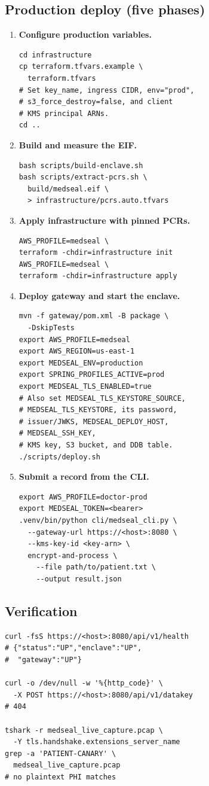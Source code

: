 \documentclass[11pt]{article}
\begin{document}
\subsection{Production deploy (five phases)}
\begin{enumerate}\setlength{\itemsep}{1pt}
    \item \textbf{Configure production variables.}
\begin{verbatim}
cd infrastructure
cp terraform.tfvars.example \
  terraform.tfvars
# Set key_name, ingress CIDR, env="prod",
# s3_force_destroy=false, and client
# KMS principal ARNs.
cd ..
\end{verbatim}
    \item \textbf{Build and measure the EIF.}
\begin{verbatim}
bash scripts/build-enclave.sh
bash scripts/extract-pcrs.sh \
  build/medseal.eif \
  > infrastructure/pcrs.auto.tfvars
\end{verbatim}
    \item \textbf{Apply infrastructure with pinned PCRs.}
\begin{verbatim}
AWS_PROFILE=medseal \
terraform -chdir=infrastructure init
AWS_PROFILE=medseal \
terraform -chdir=infrastructure apply
\end{verbatim}
    \item \textbf{Deploy gateway and start the enclave.}
\begin{verbatim}
mvn -f gateway/pom.xml -B package \
  -DskipTests
export AWS_PROFILE=medseal
export AWS_REGION=us-east-1
export MEDSEAL_ENV=production
export SPRING_PROFILES_ACTIVE=prod
export MEDSEAL_TLS_ENABLED=true
# Also set MEDSEAL_TLS_KEYSTORE_SOURCE,
# MEDSEAL_TLS_KEYSTORE, its password,
# issuer/JWKS, MEDSEAL_DEPLOY_HOST,
# MEDSEAL_SSH_KEY,
# KMS key, S3 bucket, and DDB table.
./scripts/deploy.sh
\end{verbatim}
    \item \textbf{Submit a record from the CLI.}
\begin{verbatim}
export AWS_PROFILE=doctor-prod
export MEDSEAL_TOKEN=<bearer>
.venv/bin/python cli/medseal_cli.py \
  --gateway-url https://<host>:8080 \
  --kms-key-id <key-arn> \
  encrypt-and-process \
    --file path/to/patient.txt \
    --output result.json
\end{verbatim}
\end{enumerate}

\subsection{Verification}
\begin{verbatim}
curl -fsS https://<host>:8080/api/v1/health
# {"status":"UP","enclave":"UP",
#  "gateway":"UP"}

curl -o /dev/null -w '%{http_code}' \
  -X POST https://<host>:8080/api/v1/datakey
# 404

tshark -r medseal_live_capture.pcap \
  -Y tls.handshake.extensions_server_name
grep -a 'PATIENT-CANARY' \
  medseal_live_capture.pcap
# no plaintext PHI matches
\end{verbatim}
\end{document}
